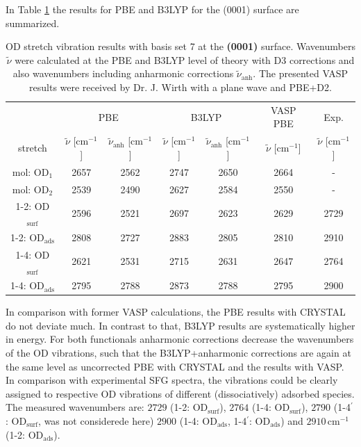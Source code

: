 \documentclass[11pt,DIV=13,BCOR=5mm,a4paper,headinclude]{scrbook}
\begin{document}
In Table \ref{tab:freqs_0001_crystal} the results for PBE and B3LYP for the (0001) surface are summarized.
\begin{table}[!h]
  \centering
  \caption{OD stretch vibration results with basis set 7 at the \textbf{(0001)} surface.
Wavenumbers $\tilde{\nu}$ were calculated at the PBE and B3LYP level of theory with D3 corrections and also wavenumbers including anharmonic corrections $\tilde{\nu}_\textrm{anh}$.
The presented VASP results were received by Dr. J. Wirth with a plane wave and PBE+D2.}
  \begin{tabular}{ccc|cc|c|c}
  \toprule
   & \multicolumn{2}{c}{PBE} & \multicolumn{2}{c}{B3LYP} &VASP PBE&Exp.\\
  stretch & $\tilde{\nu}$ [cm$^{-1}$] &$\tilde{\nu}_\textrm{anh}$ [cm$^{-1}$] &$\tilde{\nu}$ [cm$^{-1}$] & $\tilde{\nu}_\textrm{anh}$ [cm$^{-1}$]& $\tilde{\nu}$ [cm$^{-1}$]& $\tilde{\nu}$ [cm$^{-1}$]\\\midrule
  mol: OD$_{\textrm{1}}$    &2657 &2562 &2747 &2650 & 2664&-\\
  mol: OD$_{\textrm{2}}$    &2539 &2490 &2627 &2584 & 2550&-\\
  1-2: OD$_{\textrm{surf}}$ &2596 &2521 &2697 &2623 & 2629&2729\\%
  1-2: OD$_{\textrm{ads}}$  &2808 &2727 &2883 &2805 & 2810&2910\\%
  1-4: OD$_{\textrm{surf}}$ &2621 &2531 &2715 &2631 & 2647&2764\\%
  1-4: OD$_{\textrm{ads}}$  &2795 &2788 &2873 &2788 & 2795&2900\\%
  \bottomrule
    \end{tabular}
  \label{tab:freqs_0001_crystal}
\end{table}
In comparison with former VASP calculations, the PBE results with CRYSTAL do not deviate much.
In contrast to that, B3LYP results are systematically higher in energy.
For both functionals anharmonic corrections decrease the wavenumbers of the OD vibrations, such that the B3LYP+anharmonic corrections are again at the same level as uncorrected PBE with CRYSTAL and the results with VASP.
In comparison with experimental SFG spectra\cite{Wirth2014}, the vibrations could be clearly assigned to respective OD vibrations of different (dissociatively) adsorbed species.
The measured wavenumbers are: $2729$ (1-2: OD$_{\textrm{surf}}$), $2764$ (1-4: OD$_{\textrm{surf}}$), $2790$ (1-4$^\prime$: OD$_{\textrm{surf}}$, was not considerede here) $2900$ (1-4: OD$_{\textrm{ads}}$, 1-4$^\prime$: OD$_{\textrm{ads}}$) and $2910\,$cm$^{-1}$ (1-2: OD$_{\textrm{ads}}$).
\end{document}
